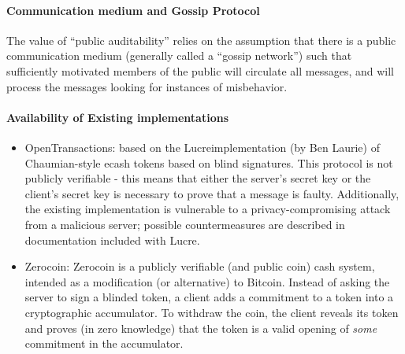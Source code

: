 \paragraph{Communication medium and Gossip Protocol}
The value of ``public auditability'' relies on the assumption that there is a public communication medium (generally called a ``gossip network'') such that sufficiently motivated members of the public will circulate all messages, and will process the messages looking for instances of misbehavior.

\paragraph{Availability of Existing implementations}
\begin{itemize}
\item OpenTransactions: based on the Lucre\citeme implementation (by Ben Laurie) of Chaumian-style ecash tokens based on blind signatures. This protocol is not publicly verifiable  - this means that either the server's secret key or the client's secret key is necessary to prove that a message is faulty. Additionally, the existing implementation is vulnerable to a privacy-compromising attack from a malicious server; possible countermeasures are described in documentation included with Lucre.
\item Zerocoin: Zerocoin is a publicly verifiable (and public coin) cash system, intended as a modification (or alternative) to Bitcoin. Instead of asking the server to sign a blinded token, a client adds a commitment to a token into a cryptographic accumulator. To withdraw the coin, the client reveals its token and proves (in zero knowledge) that the token is a valid opening of \emph{some} commitment in the accumulator.
\end{itemize}

